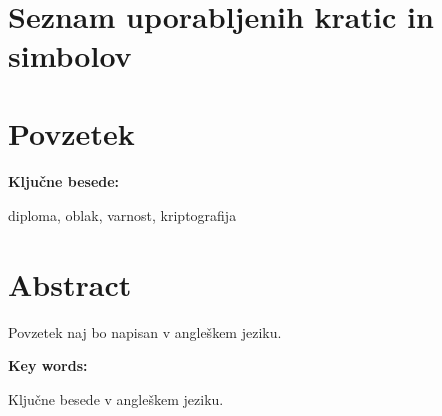 \documentclass[12pt,a4paper,openany]{book}
\begin{document}
\newpage


\ \thispagestyle{empty}

\newpage


\renewcommand\thepage{}
\tableofcontents
\renewcommand\thepage{\arabic{page}}

\thispagestyle{empty}



\chapter*{Seznam uporabljenih kratic in simbolov}
\thispagestyle{empty}

\printglossaries


\clearpage{\pagestyle{empty}\cleardoublepage}


\setcounter{page}{1}

\chapter*{Povzetek}



\vspace{1.3cm}
\noindent
{\large \bf Ključne besede:}

\vspace{0.5cm}
\noindent
diploma, oblak, varnost, kriptografija


\chapter*{Abstract}


Povzetek naj bo napisan v angleškem jeziku.

\vspace{1.3cm}
\noindent
{\large \bf Key words:}

\vspace{0.5cm}
\noindent
Ključne besede v angleškem jeziku.
\end{document}
